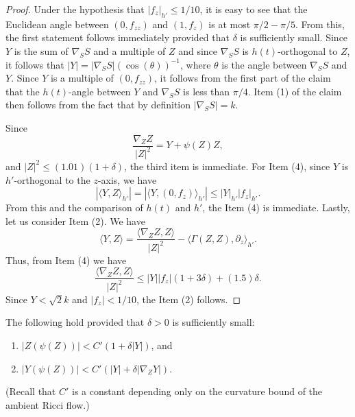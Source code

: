 \begin{proof}
Under the hypothesis that $|f_z|_{h'}\le 1/10$, it is easy to see
that the Euclidean angle between $(0,f_{zz})$ and $(1,f_z)$ is at
most $\pi/2-\pi/5$. From this, the first statement follows
immediately provided that $\delta$ is sufficiently small. Since $Y$
is the sum of $\nabla_SS$ and a multiple of $Z$ and since
$\nabla_SS$ is $h(t)$-orthogonal to $Z$, it follows that
$|Y|=|\nabla_SS|\left(\cos(\theta)\right)^{-1}$, where $\theta$
is the angle between $\nabla_SS$ and $Y$. Since $Y$ is a multiple of
$(0,f_{zz})$, it follows from the first part of the claim that the
$h(t)$-angle between $Y$ and $\nabla_SS$ is less than $\pi/4$. Item
(1) of the claim then follows from the fact that by definition
$|\nabla_SS|=k$.

Since
$$\frac{\nabla_ZZ}{|Z|^2}=Y+\psi(Z)Z,$$ and $|Z|^2\le (1.01)(1+\delta)$, the third item is
immediate. For Item (4), since $Y$ is $h'$-orthogonal to the $z$-axis, we have
$$\left|\langle Y,Z\rangle_{h'}\right|=\left|\langle Y,(0,f_z)\rangle_{h'}\right|\le |Y|_{h'}|f_z|_{h'}.$$
From this and the comparison of $h(t)$ and $h'$, the Item (4) is
immediate. Lastly, let us consider Item (2). We have
$$\langle Y,Z\rangle =\frac{\langle \nabla_ZZ,Z\rangle}{|Z|^2}-\langle
\Gamma(Z,Z),\partial_z\rangle_{h'}.$$ Thus, from Item (4) we have
$$\frac{\langle \nabla_ZZ,Z\rangle}{|Z|^2}\le |Y||f_z|(1+3\delta)+(1.5)\delta.$$
Since $Y<\sqrt{2}k$ and $|f_z|<1/10$, the Item (2) follows.
\end{proof}

\begin{claim}
\label{claim:graph-flow-connection-term-bounds}
\label{psiclaim}
The following hold provided that $\delta>0$ is sufficiently small:
\begin{enumerate}
\item[(1)] $|Z(\psi(Z))|<C'(1+\delta |Y|)$, and
\item[(2)] $|Y(\psi(Z))|<C'(|Y|+\delta|\nabla_ZY|)$.
\end{enumerate}
(Recall that $C'$ is a constant depending only on the curvature bound of the
ambient Ricci flow.)
\end{claim}


